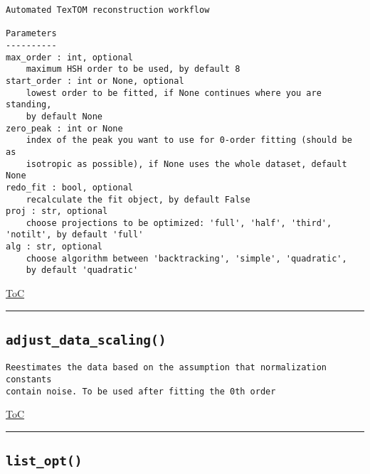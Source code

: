 \documentclass{article}
\begin{document}
\begin{lstlisting}[language=docstring]
Automated TexTOM reconstruction workflow

Parameters
----------
max_order : int, optional
    maximum HSH order to be used, by default 8    
start_order : int or None, optional
    lowest order to be fitted, if None continues where you are standing, 
    by default None
zero_peak : int or None
    index of the peak you want to use for 0-order fitting (should be as
    isotropic as possible), if None uses the whole dataset, default None
redo_fit : bool, optional
    recalculate the fit object, by default False
proj : str, optional
    choose projections to be optimized: 'full', 'half', 'third', 'notilt', by default 'full'
alg : str, optional
    choose algorithm between 'backtracking', 'simple', 'quadratic', 
    by default 'quadratic'
\end{lstlisting}

\begin{flushright}

\hyperref[toc]{ToC}

\end{flushright}



\vspace{5mm}

\hrule

\subsection*{\texttt{adjust\_data\_scaling()}}

\begin{lstlisting}[language=docstring]
Reestimates the data based on the assumption that normalization constants
contain noise. To be used after fitting the 0th order
\end{lstlisting}

\begin{flushright}

\hyperref[toc]{ToC}

\end{flushright}



\vspace{5mm}

\hrule

\subsection*{\texttt{list\_opt()}}
\end{document}
